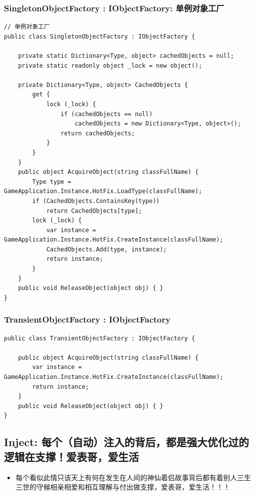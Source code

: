 \documentclass[9pt, b5paper]{article}
\begin{document}
\subsubsection{SingletonObjectFactory : IObjectFactory: 单例对象工厂}
\label{sec-5-2-4}
\begin{verbatim}
// 单例对象工厂
public class SingletonObjectFactory : IObjectFactory {

    private static Dictionary<Type, object> cachedObjects = null;
    private static readonly object _lock = new object();

    private Dictionary<Type, object> CachedObjects {
        get {
            lock (_lock) {
                if (cachedObjects == null) 
                    cachedObjects = new Dictionary<Type, object>();
                return cachedObjects;
            }
        }
    }
    public object AcquireObject(string classFullName) {
        Type type = GameApplication.Instance.HotFix.LoadType(classFullName);
        if (CachedObjects.ContainsKey(type)) 
            return CachedObjects[type];
        lock (_lock) {
            var instance = GameApplication.Instance.HotFix.CreateInstance(classFullName);
            CachedObjects.Add(type, instance);
            return instance;
        }
    }
    public void ReleaseObject(object obj) { }
}
\end{verbatim}
\subsubsection{TransientObjectFactory : IObjectFactory}
\label{sec-5-2-5}
\begin{verbatim}
public class TransientObjectFactory : IObjectFactory {

    public object AcquireObject(string classFullName) {
        var instance = GameApplication.Instance.HotFix.CreateInstance(classFullName);
        return instance;
    }
    public void ReleaseObject(object obj) { }
}
\end{verbatim}
\subsection{Inject: 每个（自动）注入的背后，都是强大优化过的逻辑在支撑！爱表哥，爱生活}
\label{sec-5-3}
\begin{itemize}
\item 每个看似此情只该天上有何在发生在人间的神仙着侣故事背后都有着别人三生三世的守候相亲相爱和相互理解与付出做支撑，爱表哥，爱生活！！！
\end{itemize}
\end{document}
